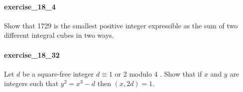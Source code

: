 \documentclass{article}
\begin{document}
\paragraph{exercise\_18\_4} Show that 1729 is the smallest positive integer expressible as the sum of two different integral cubes in two ways.

\paragraph{exercise\_18\_32} Let $d$ be a square-free integer $d \equiv 1$ or 2 modulo 4 . Show that if $x$ and $y$ are integers such that $y^{2}=x^{3}-d$ then $(x, 2 d)=1$.
\end{document}
